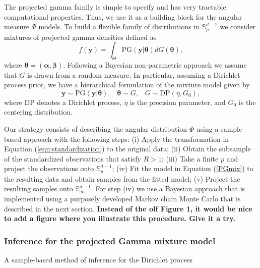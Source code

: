   The projected gamma family is simple to specify and has very tractable computational properties. Thus, we use it as a building block for the angular measure $\Phi$ models. To build a flexible family of distributions in ${\mathbb S}_p^{d-1}$ we consider mixtures of projected gamma densities defined as
  \begin{equation} \label{eqn:PGmix}     
     f(\bm{y}) = \int_\Theta \text{PG}(\bm{y}|\bm{\theta}) dG(\bm{\theta}), 
  \end{equation} 
  where $\bm{\theta} = (\bm{\alpha}, \bm{\beta})$. Following a Bayesian non-parametric approach \citep{Ferguson74,Antoniak1974} we assume that $G$ is drawn from a random measure. In particular, assuming a Dirichlet process prior, we have a hierarchical formulation of the mixture model given by
  \[    \bm{y} \sim \text{PG}(\bm{y}|\bm{\theta}) , \;\;\; \bm{\theta} \sim G, \;\;\; G \sim \text{DP}(\eta, G_0),\]
  where DP denotes a Dirichlet process, $\eta$ is the precision parameter, and $G_0$ is the centering distribution. 
  
  Our strategy consists of describing the angular distribution $\Phi$ using a sample based approach with the following steps: (i) Apply the transformation in Equation (\ref{eqn:standardization}) to the original data; (ii) Obtain the subsample of the standardized observations that satisfy $R>1$; (iii) Take a finite $p$ and project the observations onto ${\mathbb S}_p^{d-1}$; (iv) Fit the model in Equation (\ref{PGmix}) to the resulting data and obtain samples from the fitted model; (v) Project the resulting samples onto ${\mathbb S}_\infty^{d-1}$.
  For step (iv) we use a Bayesian approach that is implemented using a purposely developed Markov chain Monte Carlo that is described in the next section. 
  {\bf Instead of the olf Figure 1, it would be nice to add a figure where you illustrate this procedure. Give it a try.}

\subsubsection{Inference for the projected Gamma mixture model}
A sample-based method of inference for the Dirichlet process 

